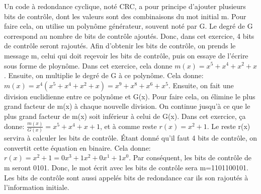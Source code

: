Un code à redondance cyclique, noté CRC, a pour principe d'ajouter plusieurs bits de contrôle, dont les valeurs sont
des combinaisons du mot initial m.
Pour faire cela, on utilise un polynôme générateur, souvent noté par G.
Le degré de G correspond au nombre de bits de contrôle ajoutés. Donc, dans cet exercice, 4 bits de contrôle seront
rajoutés.
Afin d'obtenir les bits de contrôle, on prends le message m, celui qui doit reçevoir les bits de contrôle, puis on
essaye de l'écrire sous forme de ploynôme.
Dans cet exercice, cela donne $m(x)=x^5+x^4+x^2+x$. Ensuite, on multiplie le degré de G à ce polynôme.
Cela donne: $m(x)=x^4(x^5+x^4+x^2+x)=x^9+x^8+x^6+x^5$.
Ensuite, on fait une division euclidienne entre ce polynôme et G(x).
Pour faire cela, on élimine le plus grand facteur de m(x) à chaque nouvelle division. On continue jusqu'à ce que
le plus grand facteur de m(x) soit inférieur à celui de G(x).
Dans cet exercice, ça donne: $\frac{m(x)}{G(x)}=x^5+x^4+x+1$, et à comme reste $r(x)=x^2+1$.
Le reste r(x) servira à calculer les bits de contrôle. Étant donné qu'il faut 4 bits de contrôle, on convertit cette
équation en binaire.
Cela donne: $r(x)=x^2+1=0x^3+1x^2+0x^1+1x^0$. Par conséquent, les bits de contrôle de m seront 0101.
Donc, le mot écrit avec les bits de contrôle sera m=1101100101.
Les bits de contrôle sont aussi appelés bits de redondance car ils son rajoutés à l'information initiale.
